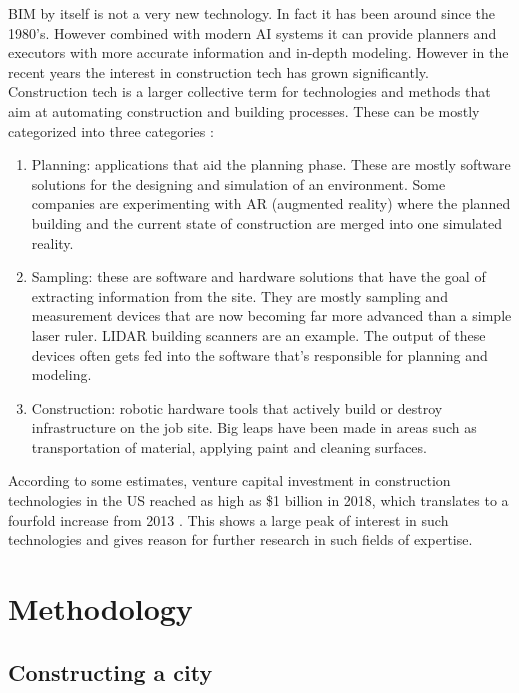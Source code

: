 \documentclass[
]{elteikthesis}[2023/04/10]
\begin{document}
BIM by itself is not a very new technology. In fact it has been around
since the 1980's. However combined with modern AI systems it can provide
planners and executors with more accurate information and in-depth
modeling. However in the recent years the interest in construction
tech has grown significantly. Construction tech is a larger collective
term for technologies and methods that aim at automating construction
and building processes. These can be mostly categorized into three
categories \cite{sacks2020building}: 
\begin{enumerate}
\item Planning: applications that aid the planning phase. These are mostly
software solutions for the designing and simulation of an environment.
Some companies are experimenting with AR (augmented reality) where
the planned building and the current state of construction are merged
into one simulated reality.
\item Sampling: these are software and hardware solutions that have the
goal of extracting information from the site. They are mostly sampling
and measurement devices that are now becoming far more advanced than
a simple laser ruler. LIDAR building scanners are an example.
The output of these devices often gets fed into the software that's
responsible for planning and modeling.
\item Construction: robotic hardware tools that actively build or destroy
infrastructure on the job site. Big leaps have been made in areas
such as transportation of material, applying paint and cleaning surfaces. 
\end{enumerate}
According to some estimates, venture capital investment in construction
technologies in the US reached as high as \$1 billion in 2018, which
translates to a fourfold increase from 2013 \cite{andersen2018state}.
This shows a large peak of interest in such technologies and gives
reason for further research in such fields of expertise.

\newpage{}

\chapter{Methodology}

\section{Constructing a city }
\end{document}
